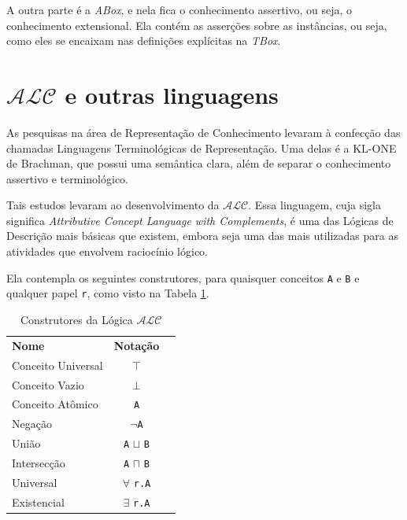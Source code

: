 A outra parte é a \textit{ABox}, e nela fica o conhecimento assertivo, ou seja, o conhecimento extensional. Ela contém as asserções sobre as instâncias, ou seja, como eles se encaixam nas definições explícitas na \textit{TBox}.

\section{$\mathcal{ALC}$ e outras linguagens}

As pesquisas na área de Representação de Conhecimento levaram à confecção das chamadas Linguagens Terminológicas de Representação. Uma delas é a KL-ONE de Brachman, que possui uma semântica clara, além de separar o conhecimento assertivo e terminológico. %

Tais estudos levaram ao desenvolvimento da $\mathcal{ALC}$. Essa linguagem, cuja sigla significa \textit{Attributive Concept Language with Complements}, é uma das Lógicas de Descrição mais básicas que existem, embora seja uma das mais utilizadas para as atividades que envolvem raciocínio lógico. 

Ela contempla os seguintes construtores, para quaisquer conceitos \texttt{A} e \texttt{B} e qualquer papel \texttt{r}, como visto na Tabela \ref{tab:alc}.

\begin{table}[H]
	\centering
	\begin{tabular}{|l|c|l}
		\cline{1-2}
		\textbf{Nome}               & \textbf{Notação}                          &  \\ \cline{1-2}
		Conceito Universal & $ \top $                         &  \\ \cline{1-2}
		Conceito Vazio     & $ \bot $                         &  \\ \cline{1-2}
		Conceito Atômico   & \texttt{A}                       &  \\ \cline{1-2}
		Negação            & $ \neg $\texttt{A}               &  \\ \cline{1-2}
		União              & \texttt{A} $ \sqcup $ \texttt{B} &  \\ \cline{1-2}
		Intersecção        & \texttt{A} $ \sqcap $ \texttt{B} &  \\ \cline{1-2}
		Universal          & $\forall$ \texttt{r.A}           &  \\ \cline{1-2}
		Existencial        & $\exists$ \texttt{r.A}           &  \\ \cline{1-2}
	\end{tabular}
	\caption{Construtores da Lógica $ \mathcal{ALC} $}
	\label{tab:alc}
\end{table}

